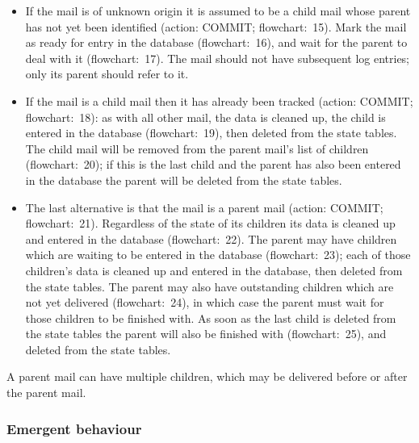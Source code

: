 \begin{itemize}

    \item If the mail is of unknown origin it is assumed to be a child mail
        whose parent has not yet been identified (action: COMMIT\@;
        flowchart:~15).  Mark the mail as ready for entry in the database
        (flowchart:~16), and wait for the parent to deal with it
        (flowchart:~17).  The mail should not have subsequent log entries;
        only its parent should refer to it.

    \item If the mail is a child mail then it has already been tracked
        (action: COMMIT\@; flowchart:~18): as with all other mail, the data
        is cleaned up, the child is entered in the database
        (flowchart:~19), then deleted from the state tables.  The child
        mail will be removed from the parent mail's list of children
        (flowchart:~20); if this is the last child and the parent has also
        been entered in the database the parent will be deleted from the
        state tables.

    \item The last alternative is that the mail is a parent mail (action:
        COMMIT\@; flowchart:~21).  Regardless of the state of its children
        its data is cleaned up and entered in the database (flowchart:~22).
        The parent may have children which are waiting to be entered in the
        database (flowchart:~23); each of those children's data is cleaned
        up and entered in the database, then deleted from the state tables.
        The parent may also have outstanding children which are not yet
        delivered (flowchart:~24), in which case the parent must wait for
        those children to be finished with.  As soon as the last child is
        deleted from the state tables the parent will also be finished with
        (flowchart:~25), and deleted from the state tables.

\end{itemize}

A parent mail can have multiple children, which may be delivered before or
after the parent mail.

\subsubsection{Emergent behaviour}

\label{Emergent behaviour}

